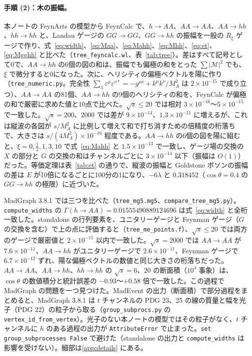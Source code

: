 \documentclass[a4paper,10pt]{ltjsarticle}
\begin{document}
\paragraph{手順 (2)：木の振幅。}本ノートの FeynArts の模型から FeynCalc で、$h\to AA$、$AA\to AA$、$AA\to hh$、$hh\to hh$ と、Landau ゲージの $GG\to GG$、$GG\to hh$ の振幅を一般の $R_\xi$ ゲージで作り、式~\eqref{eq:width}、\eqref{eq:Maa}、\eqref{eq:Mahh}、\eqref{eq:Mhh}、\eqref{eq:et}、\eqref{eq:Mgghh} と比べた（\texttt{tree\_feyncalc.wl}、表~\ref{tab:tree}）。差はすべて記号として0で、$AA\to hh$ の6個の図の和は、振幅でも偏極の和をとった $\sum|\mathcal M|^2$ でも、$\xi$ で微分すると0になった。次に、ヘリシティの偏極ベクトルを陽に作り（\texttt{tree\_numeric.py}。完全性 $\sum_\lambda\varepsilon^\mu\varepsilon^{\nu*}=-g^{\mu\nu}+k^\mu k^\nu/M_A^2$ は $2\times10^{-15}$ で成り立つ）、$AA\to AA$ の81個、$AA\to hh$ の9個のヘリシティの和を、FeynCalc が偏極の和で厳密に求めた値と10点で比べた。$\sqrt s\le20$ では相対 $3\times10^{-16}$〜$5\times10^{-15}$ で一致した。$\sqrt s=200$、$2000$ では差が $9\times10^{-14}$、$1.3\times10^{-11}$ に増えるが、これは縦波の各図が $s/M_A^2$ に比例して増えて和で打ち消すための倍精度の桁落ちで、大きさは $s/(4M_A^2)\times10^{-16}$ 程度である。$AA\to hh$ の6個の図を陽に組むと、$\xi=0,\frac12,1,3,10$ で式~\eqref{eq:Mahh} と $1.5\times10^{-13}$ で一致し、ゲージ場の交換の $X$ の部分と $G$ の交換の和はチャンネルごとに $3\times10^{-14}$ 以下（振幅は $O(1)$）だった。等価定理は表~\ref{tab:et} の通りで、縦波の振幅と Goldstone ボソンの振幅の差は $E$ が10倍になるごとに100分の1になり、$-6\lambda$ と $0.318452$（$\cos\theta=0.4$ の $GG\to hh$ の極限）に近づいた。

MadGraph 3.8.1 では三つを比べた（\texttt{tree\_mg5.mg5}、\texttt{compare\_tree\_mg5.py}）。\texttt{compute\_widths} の $\Gamma(h\to AA)=0.01555490889124696$ は式~\eqref{eq:width} と全桁一致した。standalone の行列要素を、ユニタリーゲージと Feynman ゲージ（$G$ の交換を含む）で上の点に評価すると（\texttt{tree\_me\_points.f}）、$\sqrt s\le20$ では両方のゲージで厳密値と $2\times10^{-15}$ 以内で一致した。$\sqrt s=2000$ では $AA\to AA$ が $7.6\times10^{-11}$、$AA\to hh$ がユニタリーゲージで $2.6\times10^{-11}$、Feynman ゲージで $6.7\times10^{-12}$ ずれ、陽な偏極ベクトルの数値と同じ大きさの桁落ちだった。$AA\to AA$、$AA\to hh$、$hh\to hh$ の $\sqrt s=6$、$20$ の断面積（$10^4$ 事象）は、$\cos\theta$ の数値積分と統計誤差の $-0.93$〜$+0.58$ 倍で一致した。この過程で MadGraph の問題を一つ見つけた。MadEvent の出力（断面積）で部分過程をまとめると、MadGraph 3.8.1 は $t$ チャンネルの PDG 23、25 の線の質量と幅を光子（PDG 22）の粒子から取る（\texttt{group\_subprocs.py} の \texttt{vertex\_id\_from\_vertex}）。光子のない本ノートの模型ではその粒子がなく、$t$ チャンネルに $h$ のある過程の出力が \texttt{AttributeError} で止まった。\texttt{set group\_subprocesses False} で避けた（standalone の出力と \texttt{compute\_widths} は影響を受けない）。細部は\ref{app:details} にある。
\end{document}
